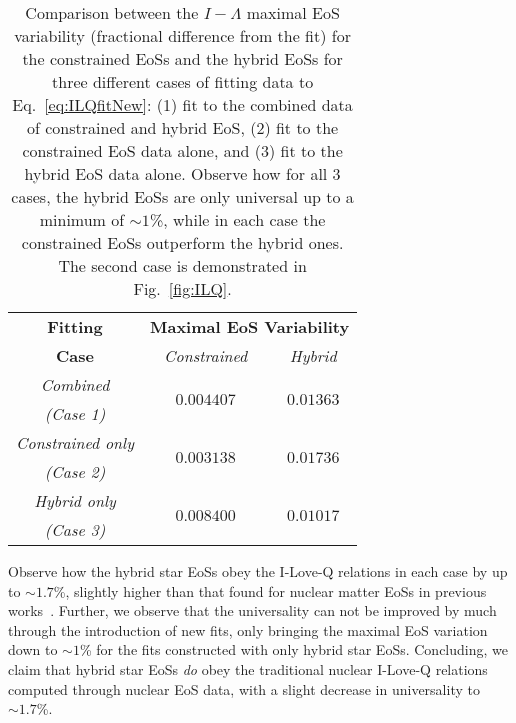 \documentclass[prd,twocolumn,nofootinbib,superscriptaddress,amsmath,amssymb]{revtex4-1}
\begin{document}
\begin{table}
\centering
\caption{
Comparison between the $I-\Lambda$ maximal EoS variability (fractional difference from the fit) for the constrained EoSs and the hybrid EoSs for three different cases of fitting data to Eq.~\ref{eq:ILQfitNew}: (1) fit to the combined data of constrained and hybrid EoS, (2) fit to the constrained EoS data alone, and (3) fit to the hybrid EoS data alone.
Observe how for all 3 cases, the hybrid EoSs are only universal up to a minimum of $\sim1$\%, while in each case the constrained EoSs outperform the hybrid ones.
The second case is demonstrated in Fig.~\ref{fig:ILQ}.
}\label{tab:hybridCompare}
\begin{tabular}{ c  || c c } 
 \hline
 \hline
 \textbf{Fitting} & \multicolumn{2}{c}{\textbf{Maximal EoS Variability}} \\
 \cline{2-3}
 \textbf{Case} &  \multicolumn{1}{c|}{\emph{Constrained}} & \emph{Hybrid}\\
 \hline
 \emph{Combined} &  \multirow{2}{*}{$0.004407$} & \multirow{2}{*}{$0.01363$}\\
 \emph{(Case 1)} & &\\
 \cline{1-1}
 \emph{Constrained only} & \multirow{2}{*}{$0.003138$} & \multirow{2}{*}{$0.01736$}\\
  \emph{(Case 2)} & &\\
  \cline{1-1}
 \emph{Hybrid only} & \multirow{2}{*}{$0.008400$} & \multirow{2}{*}{$0.01017$}\\
  \emph{(Case 3)} & &\\
  \cline{1-1}
\hline
\hline
\end{tabular}
\end{table}

Observe how the hybrid star EoSs obey the I-Love-Q relations in each case by up to $\sim1.7$\%, slightly higher than that found for nuclear matter EoSs in previous works~\cite{Yagi:ILQ}.
Further, we observe that the universality can not be improved by much through the introduction of new fits, only bringing the maximal EoS variation down to $\sim1$\% for the fits constructed with only hybrid star EoSs.
Concluding, we claim that hybrid star EoSs \emph{do} obey the traditional nuclear I-Love-Q relations computed through nuclear EoS data, with a slight decrease in universality to $\sim1.7$\%.  

\end{document}
